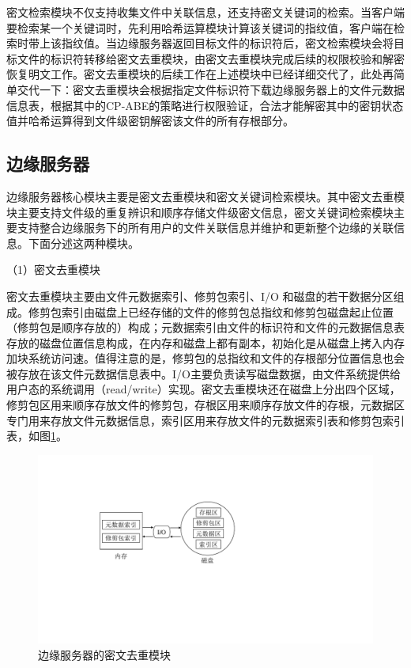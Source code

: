 \documentclass[promaster]{thesis-uestc}
\begin{document}
密文检索模块不仅支持收集文件中关联信息，还支持密文关键词的检索。当客户端要检索某一个关键词时，先利用哈希运算模块计算该关键词的指纹值，客户端在检索时带上该指纹值。当边缘服务器返回目标文件的标识符后，密文检索模块会将目标文件的标识符转移给密文去重模块，由密文去重模块完成后续的权限校验和解密恢复明文工作。密文去重模块的后续工作在上述模块中已经详细交代了，此处再简单交代一下：密文去重模块会根据指定文件标识符下载边缘服务器上的文件元数据信息表，根据其中的CP-ABE的策略进行权限验证，合法才能解密其中的密钥状态值并哈希运算得到文件级密钥解密该文件的所有存根部分。

\subsection{边缘服务器}\label{边缘服务器的实现}
边缘服务器核心模块主要是密文去重模块和密文关键词检索模块。其中密文去重模块主要支持文件级的重复辨识和顺序存储文件级密文信息，密文关键词检索模块主要支持整合边缘服务下的所有用户的文件关联信息并维护和更新整个边缘的关联信息。下面分述这两种模块。

（1）密文去重模块

密文去重模块主要由文件元数据索引、修剪包索引、I/O 和磁盘的若干数据分区组成。修剪包索引由磁盘上已经存储的文件的修剪包总指纹和修剪包磁盘起止位置（修剪包是顺序存放的）构成；元数据索引由文件的标识符和文件的元数据信息表存放的磁盘位置信息构成，在内存和磁盘上都有副本，初始化是从磁盘上拷入内存加块系统访问速。值得注意的是，修剪包的总指纹和文件的存根部分位置信息也会被存放在该文件元数据信息表中。I/O主要负责读写磁盘数据，由文件系统提供给用户态的系统调用（read/write）实现。密文去重模块还在磁盘上分出四个区域，修剪包区用来顺序存放文件的修剪包，存根区用来顺序存放文件的存根，元数据区专门用来存放文件元数据信息，索引区用来存放文件的元数据索引表和修剪包索引表，如图\ref{边缘服务器的密文去重模块}。
\begin{figure}[htbp]
    \centering
    \includegraphics[width = 0.7\linewidth]{pic/边缘服务器的密文重删模块.pdf}
    \caption{边缘服务器的密文去重模块}
    \label{边缘服务器的密文去重模块}
\end{figure}
\end{document}
